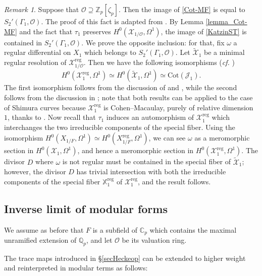 \documentclass[a4paper,11pt]{amsart}
\numberwithin{equation}{section}
\theoremstyle{plain}
\theoremstyle{definition}
\theoremstyle{remark}
\newtheorem{remark}[theorem]{Remark}
\newcommand{\Q}{\mathbb{Q}}
\newcommand{\Z}{\mathbb{Z}}
\newcommand{\C}{\mathbb{C}}
\newcommand{\reg}{\mathrm{reg}}
\newcommand{\Cot}{\mathrm{Cot}}
\begin{document}
\begin{remark}\label{propGross} Suppose that $\mathcal{O}\supseteq\Z_p[\zeta_{p}]$. Then the image of \eqref{Cot-MF} is equal to $S_2'(\Gamma_1,\mathcal{O})$. 
The proof of this fact is adapted from \cite[Proposition 8.4]{Gross-Tameness}. By Lemma \ref{lemma_Cot-MF} and the fact that $\tau_1$
preserves $H^0(\mathcal{X}_{1/\mathcal{O}},\Omega^1)$, 
the 
image of \eqref{KatzinST} is contained in $S_2'(\Gamma_1,\mathcal{O})$. We prove the opposite inclusion: for that, fix $\omega$ a regular differential on $X_1$ which belongs to $S_2'(\Gamma_1,\mathcal{O})$. Let $\widetilde{\mathcal{X}}_1$ be a minimal regular resolution of $\mathcal{X}_{1/\mathcal{O}}^\reg$. 
Then we have the following isomorphisms (\emph{cf.} \cite[\S3.4]{Ohta-ES})
\[H^0(\mathcal{X}_1^\reg,\Omega^1)\simeq H^0(\widetilde{\mathcal{X}}_1,\Omega^1)\simeq\Cot(\mathcal{J}_1).\]
The first isomorphism follows from the discussion of \cite[II, 3]{Mazur-Eisenstein} and \cite[\S6]{Wiles1}, while the second follows from the discussion in \cite[\S2(e)]{Mazur-Rational}; note that both results can be applied to the case of Shimura curves because $\mathcal{X}_1^\reg$ is Cohen--Macaulay, purely of relative dimension $1$, thanks to \cite{Buz}. Now recall that $\tau_1$ induces an automorphism of $\mathcal{X}_1^\reg$ which interchanges the two irreducible components of the special fiber.
Using the isomorphism $H^0(X_{1/F},\Omega^1)\simeq H^0(X_{1/F}^\reg,\Omega^1)$, we can see $\omega$ as a meromorphic section in $H^0(\mathcal{X}_{1},\Omega^1)$, and hence a meromorphic section in $H^0(\mathcal{X}_{1}^\reg,\Omega^1)$. 
The divisor $D$ where $\omega$ is not regular must be contained in the special fiber of $\widetilde{\mathcal{X}}_{1}$; however, the divisor $D$ has trivial intersection with both the irreducible components of the special fiber $\mathbb{X}_{1}^\mathrm{reg}$ of $\mathcal{X}_1^\reg$, and the result follows. 
\end{remark}
 
\subsection{Inverse limit of modular forms} 
We assume as before that $F$ is a subfield of $\C_p$ which contains the maximal unramified extension of $\Q_p$, and let $\mathcal{O}$ be its valuation ring. 

The trace maps introduced in \S\ref{secHeckeop} can be extended to higher weight and reinterpreted in modular terms as follows:
\end{document}
